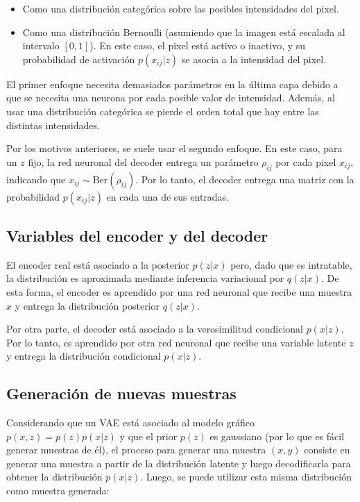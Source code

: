 \documentclass{article}
\begin{document}
\begin{itemize}
	\item Como una distribución categórica sobre las posibles intensidades del pixel.
	\item Como una distribución Bernoulli (asumiendo que la imagen está escalada al intervalo $[0,1]$). En este caso, el pixel está activo o inactivo, y su probabilidad de activación $p(x_{ij}|z)$ se asocia a la intensidad del pixel.
\end{itemize}

El primer enfoque necesita demasiados parámetros en la última capa debido a que se necesita una neurona por cada posible valor de intensidad. Además, al usar una distribución categórica se pierde el orden total que hay entre las distintas intensidades.

Por los motivos anteriores, se suele usar el segundo enfoque. En este caso, para un $z$ fijo, la red neuronal del decoder entrega un parámetro $\rho_{ij}$ por cada pixel $x_{ij}$, indicando que $x_{ij}\sim\text{Ber}(\rho_{ij})$. Por lo tanto, el decoder entrega una matriz con la probabilidad $p(x_{ij}|z)$ en cada una de sus entradas.

\subsection{Variables del encoder y del decoder}

El encoder real está asociado a la posterior $p(z|x)$ pero, dado que es intratable, la distribución es aproximada mediante inferencia variacional por $q(z|x)$. De esta forma, el encoder es aprendido por una red neuronal que recibe una muestra $x$ y entrega la distribución posterior $q(z|x)$.

Por otra parte, el decoder está asociado a la verosimilitud condicional $p(x|z)$. Por lo tanto, es aprendido por otra red neuronal que recibe una variable latente $z$ y entrega la distribución condicional $p(x|z)$.

\subsection{Generación de nuevas muestras}

Considerando que un VAE está asociado al modelo gráfico $p(x,z)=p(z)p(x|z)$ y que el prior $p(z)$ es gaussiano (por lo que es fácil generar muestras de él), el proceso para generar una muestra $(x,y)$ consiste en generar una muestra a partir de la distribución latente y luego decodificarla para obtener la distribución $p(x|z)$. Luego, se puede utilizar esta misma distribución como muestra generada:
\end{document}
